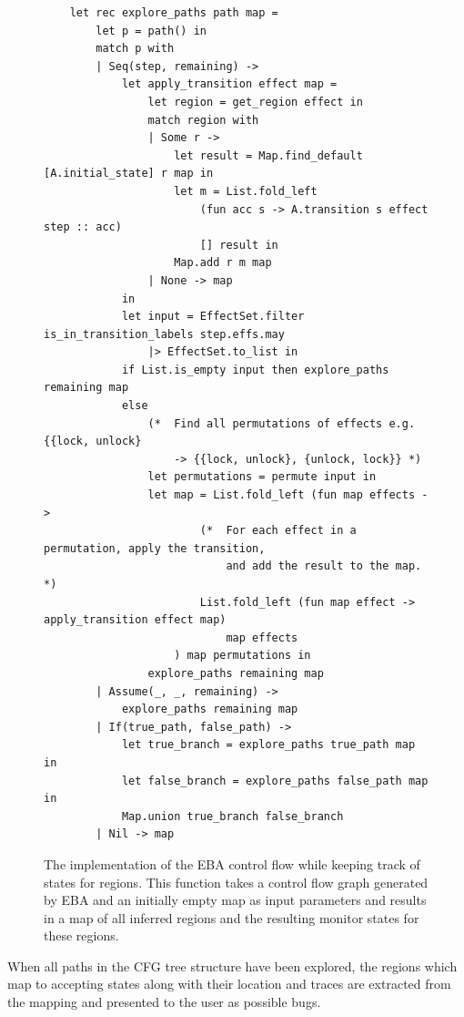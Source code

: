 \begin{figure}[H]
    \centering
    \begin{verbatim}
    let rec explore_paths path map = 
        let p = path() in
        match p with
        | Seq(step, remaining) -> 
            let apply_transition effect map = 
                let region = get_region effect in 
                match region with 
                | Some r -> 
                    let result = Map.find_default [A.initial_state] r map in 
                    let m = List.fold_left 
                        (fun acc s -> A.transition s effect step :: acc)
                        [] result in
                    Map.add r m map
                | None -> map
            in
            let input = EffectSet.filter is_in_transition_labels step.effs.may 
                |> EffectSet.to_list in
            if List.is_empty input then explore_paths remaining map 
            else 
                (*  Find all permutations of effects e.g. {{lock, unlock} 
                    -> {{lock, unlock}, {unlock, lock}} *)
                let permutations = permute input in 
                let map = List.fold_left (fun map effects ->
                        (*  For each effect in a permutation, apply the transition, 
                            and add the result to the map. *)
                        List.fold_left (fun map effect -> apply_transition effect map) 
                            map effects
                    ) map permutations in
                explore_paths remaining map
        | Assume(_, _, remaining) -> 
            explore_paths remaining map
        | If(true_path, false_path) -> 
            let true_branch = explore_paths true_path map in
            let false_branch = explore_paths false_path map in 
            Map.union true_branch false_branch
        | Nil -> map
    \end{verbatim}
    \caption{The implementation of the EBA control flow while keeping track of states for regions. This function takes a control flow graph generated by EBA and an initially empty map as input parameters and results in a map of all inferred regions and the resulting monitor states for these regions.}
    \label{explore_tree-implementation}
\end{figure}

\newpar When all paths in the CFG tree structure have been explored, the regions which map to accepting states along with their location and traces are extracted from the mapping and presented to the user as possible bugs.  

